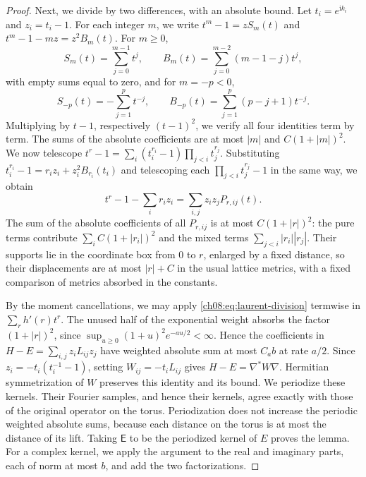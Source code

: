 \begin{proof}
Next, we divide by two differences, with an absolute bound. Let $t_i=e^{\mathrm ik_i}$ and $z_i=t_i-1$. For each integer $m$, we write $t^m-1=zS_m(t)$ and $t^m-1-mz=z^2B_m(t)$. For $m\ge0$,
\[
 S_m(t)=\sum_{j=0}^{m-1}t^j,\qquad
 B_m(t)=\sum_{j=0}^{m-2}(m-1-j)t^j,
\]
with empty sums equal to zero, and for $m=-p<0$,
\[
 S_{-p}(t)=-\sum_{j=1}^{p}t^{-j},\qquad
 B_{-p}(t)=\sum_{j=1}^{p}(p-j+1)t^{-j}.
\]
Multiplying by $t-1$, respectively $(t-1)^2$, we verify all four identities term by term. The sums of the absolute coefficients are at most $|m|$ and $C(1+|m|)^2$. We now telescope $t^r-1=\sum_i(t_i^{r_i}-1)\prod_{j<i}t_j^{r_j}$. Substituting $t_i^{r_i}-1=r_iz_i+z_i^2B_{r_i}(t_i)$ and telescoping each $\prod_{j<i}t_j^{r_j}-1$ in the same way, we obtain
\begin{equation}\label{ch08:eq:laurent-division}
 t^r-1-\sum_ir_iz_i=\sum_{i,j}z_iz_jP_{r,ij}(t).
\end{equation}
The sum of the absolute coefficients of all $P_{r,ij}$ is at most $C(1+|r|)^2$: the pure terms contribute $\sum_iC(1+|r_i|)^2$ and the mixed terms $\sum_{j<i}|r_i||r_j|$. Their supports lie in the coordinate box from $0$ to $r$, enlarged by a fixed distance, so their displacements are at most $|r|+C$ in the usual lattice metrics, with a fixed comparison of metrics absorbed in the constants.

By the moment cancellations, we may apply \eqref{ch08:eq:laurent-division} termwise in $\sum_rh'(r)t^r$. The unused half of the exponential weight absorbs the factor $(1+|r|)^2$, since $\sup_{u\ge0}(1+u)^2e^{-au/2}<\infty$. Hence the coefficients in $H-E=\sum_{i,j}z_iL_{ij}z_j$ have weighted absolute sum at most $C_ab$ at rate $a/2$. Since $z_i=-t_i(t_i^{-1}-1)$, setting $W_{ij}=-t_iL_{ij}$ gives $H-E=\nabla^*W\nabla$. Hermitian symmetrization of $W$ preserves this identity and its bound. We periodize these kernels. Their Fourier samples, and hence their kernels, agree exactly with those of the original operator on the torus. Periodization does not increase the periodic weighted absolute sums, because each distance on the torus is at most the distance of its lift. Taking $\mathsf E$ to be the periodized kernel of $E$ proves the lemma. For a complex kernel, we apply the argument to the real and imaginary parts, each of norm at most $b$, and add the two factorizations.
\end{proof}

